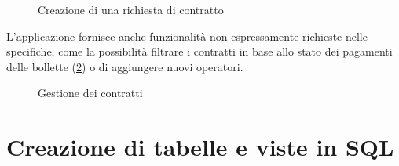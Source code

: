 \documentclass[a4paper,12pt]{report}
\begin{document}
\begin{figure}[H]
    \centering{}
    \caption{Creazione di una richiesta di contratto}
    \label{fig:sub-wizard}
\end{figure}

L'applicazione fornisce anche funzionalità non espressamente richieste nelle specifiche, come la possibilità filtrare i contratti in base allo stato dei pagamenti delle bollette (\cref{fig:sub-management}) o di aggiungere nuovi operatori.

\begin{figure}[H]
    \centering{}
    \caption{Gestione dei contratti}
    \label{fig:sub-management}
\end{figure}

\appendix
\chapter{Creazione di tabelle e viste in SQL}
\end{document}
